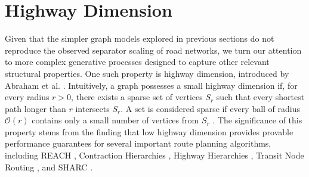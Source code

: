











\section{Highway Dimension}
\label{sec:synthetic:highway_dimension}

Given that the simpler graph models explored in previous sections do not reproduce the observed  separator scaling of road networks, we turn our attention to more complex generative processes designed to capture other relevant structural properties.
One such property is highway dimension, introduced by Abraham et al. \cite{abraham_highway_2010}.
Intuitively, a graph possesses a small highway dimension if, for every radius \(r > 0\), there exists a sparse set of vertices \(S_r\) such that every shortest path longer than \(r\) intersects \(S_r\).
A set is considered sparse if every ball of radius \(\mathcal{O}(r)\) contains only a small number of vertices from \(S_r\) \cite{abraham_highway_2010}.
The significance of this property stems from the finding that low highway dimension provides provable performance guarantees for several important route planning algorithms, including REACH \cite{goldberg_reach_2006}, Contraction Hierarchies \cite{geisberger_contraction_2008}, Highway Hierarchies \cite{sanders_highway_2005}, Transit Node Routing \cite{bast_fast_2007}, and SHARC \cite{bauer_sharc_2010}.

